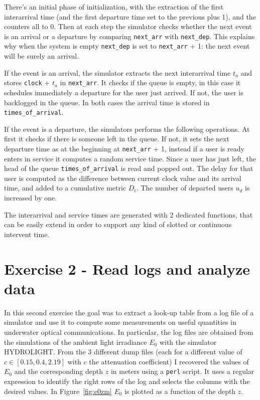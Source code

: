 \documentclass[10pt]{article}
\begin{document}
There's an initial phase of initialization, with the extraction of the first interarrival time (and the first departure time set to the previous plus 1), and the counters all to 0. Then at each step the simulator checks whether the next event is an arrival or a departure by comparing \texttt{next\_arr} with \texttt{next\_dep}. This explains why when the system is empty \texttt{next\_dep} is set to \texttt{next\_arr} + 1: the next event will be surely an arrival. 

If the event is an arrival, the simulator extracts the next interarrival time $t_a$ and stores \texttt{clock} + $t_a$ in \texttt{next\_arr}. It checks if the queue is empty, in this case it schedules immediately a departure for the user just arrived. If not, the user is backlogged in the queue. In both cases the arrival time is stored in \texttt{times\_of\_arrival}.

If the event is a departure, the simulators performs the following operations. At first it checks if there is someone left in the queue. If not, it sets the next departure time as at the beginning at \texttt{next\_arr} + 1, instead if a user is ready enters in service it computes a random service time. Since a user has just left, the head of the queue \texttt{times\_of\_arrival} is read and popped out. The delay for that user is computed as the difference between current clock value and its arrival time, and added to a cumulative metric $D_t$. The number of departed users $u_d$ is increased by one. 

The interarrival and service times are generated with 2 dedicated functions, that can be easily extend in order to support any kind of slotted or continuous intervent time.




\section*{Exercise 2 - Read logs and analyze data}
In this second exercise the goal was to extract a look-up table from a log file of a simulator and use it to compute some measurements on useful quantities in underwater optical communications. In particular, the log files are obtained from the simulations of the ambient light irradiance $E_0$ with the simulator HYDROLIGHT. From the 3 different dump files (each for a different value of $c \in [0.15, 0.4, 2.19]$ with $c$ the attenuation coefficient) I recovered the values of $E_0$ and the corresponding depth $z$ in meters using a \texttt{perl} script. It uses a regular expression to identify the right rows of the log and selects the columns with the desired values. In Figure~\ref{fig:e0zm} $E_0$ is plotted as a function of the depth $z$.
\end{document}
